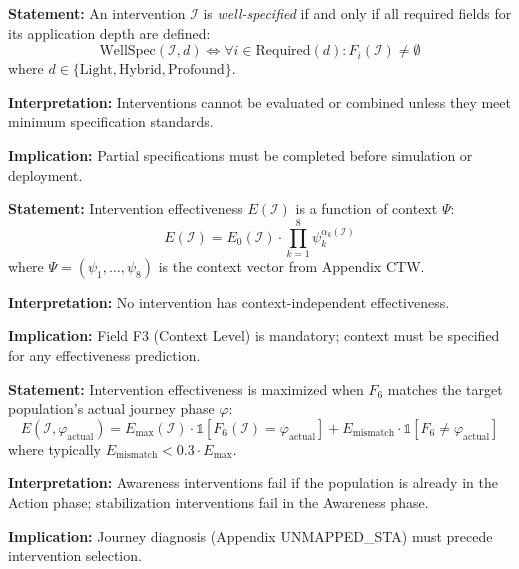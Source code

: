 \begin{tcolorbox}[colback=gray!5!white, colframe=gray!75!black,
    title=Axiom HHH-A1: Intervention Completeness]
\textbf{Statement:} An intervention $\mathcal{I}$ is \textit{well-specified} if and only if all required fields for its application depth are defined:
\begin{equation}
\text{WellSpec}(\mathcal{I}, d) \iff \forall i \in \text{Required}(d): F_i(\mathcal{I}) \neq \emptyset
\end{equation}
where $d \in \{\text{Light}, \text{Hybrid}, \text{Profound}\}$.

\textbf{Interpretation:} Interventions cannot be evaluated or combined unless they meet minimum specification standards.

\textbf{Implication:} Partial specifications must be completed before simulation or deployment.
\end{tcolorbox}

\begin{tcolorbox}[colback=gray!5!white, colframe=gray!75!black,
    title=Axiom HHH-A2: Context Dependency]
\textbf{Statement:} Intervention effectiveness $E(\mathcal{I})$ is a function of context $\Psi$:
\begin{equation}
E(\mathcal{I}) = E_0(\mathcal{I}) \cdot \prod_{k=1}^{8} \psi_k^{\alpha_k(\mathcal{I})}
\end{equation}
where $\Psi = (\psi_1, \ldots, \psi_8)$ is the context vector from Appendix CTW.

\textbf{Interpretation:} No intervention has context-independent effectiveness.

\textbf{Implication:} Field F3 (Context Level) is mandatory; context must be specified for any effectiveness prediction.
\end{tcolorbox}

\begin{tcolorbox}[colback=gray!5!white, colframe=gray!75!black,
    title=Axiom HHH-A3: Journey Phase Alignment]
\textbf{Statement:} Intervention effectiveness is maximized when $F_6$ matches the target population's actual journey phase $\varphi$:
\begin{equation}
E(\mathcal{I}, \varphi_{\text{actual}}) = E_{\max}(\mathcal{I}) \cdot \mathbb{1}[F_6(\mathcal{I}) = \varphi_{\text{actual}}] + E_{\text{mismatch}} \cdot \mathbb{1}[F_6 \neq \varphi_{\text{actual}}]
\end{equation}
where typically $E_{\text{mismatch}} < 0.3 \cdot E_{\max}$.

\textbf{Interpretation:} Awareness interventions fail if the population is already in the Action phase; stabilization interventions fail in the Awareness phase.

\textbf{Implication:} Journey diagnosis (Appendix UNMAPPED_STA) must precede intervention selection.
\end{tcolorbox}

